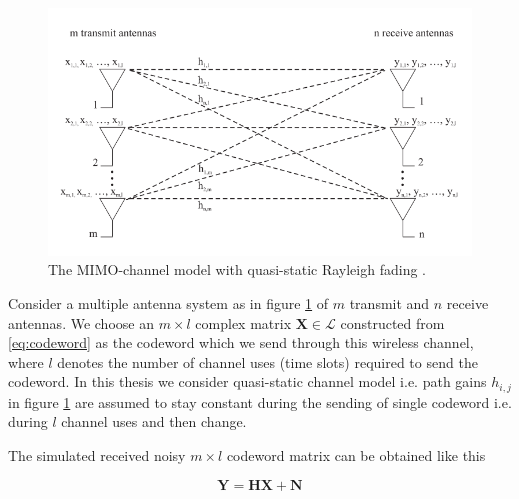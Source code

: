 \documentclass[english,12pt,a4paper,pdftex,sci,utf8]{aaltothesis}
\begin{document}
\begin{figure}[ht]
  \centering
  \includegraphics[width=\linewidth]{mimo}
  \caption{The MIMO-channel model with quasi-static Rayleigh fading \cite{mia}.}
  \label{fig:mimo}
\end{figure}

\par Consider a multiple antenna system as in figure \ref{fig:mimo} of $m$ transmit and $n$ receive antennas. We choose an $m\times l$ complex matrix $\mathbf{X} \in \mathcal{L}$ constructed from \eqref{eq:codeword} as the codeword which we send through this wireless channel, where $l$ denotes the number of channel uses (time slots) required to send the codeword. In this thesis we consider quasi-static channel model i.e. path gains $h_{i,j}$ in figure \ref{fig:mimo} are assumed to stay constant during the sending of single codeword i.e. during $l$ channel uses and then change. 
\par The simulated received noisy $m\times l$ codeword matrix can be obtained like this

\begin{equation}
\mathbf{Y} = \mathbf{HX} + \mathbf{N}
\label{eq:system}
\end{equation}
\end{document}
